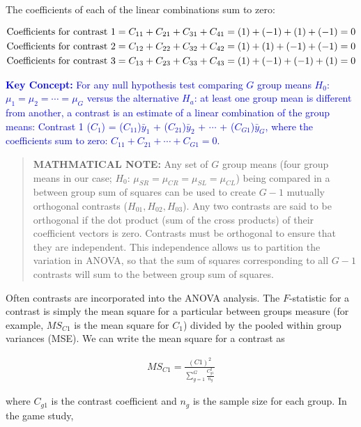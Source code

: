 \documentclass[
]{book}
\begin{document}
The coefficients of each of the linear combinations sum to zero:

\begin{align}
\text{Coefficients for contrast 1} &= C_{11} + C_{21} + C_{31} + C_{41} = (1) + (-1) + (1) + (-1) = 0 \notag \\
\text{Coefficients for contrast 2} &= C_{12} + C_{22} + C_{32} + C_{42} = (1) + (1) + (-1) + (-1) = 0 \notag \\
\text{Coefficients for contrast 3} &= C_{13} + C_{23} + C_{33} + C_{43} = (1) + (-1) + (-1) + (1) = 0
\notag
\end{align}

\textbf{\textcolor{blue}{Key Concept:}}
\textcolor{blue}{For any null hypothesis test comparing $G$ group means $H_0$: $\mu_1 = \mu_2 = \cdots = \mu_G$ versus the alternative $H_a$: at least one group mean is different from another, a contrast is an estimate of a linear combination of the group means: Contrast 1 ($C_1$) = ($C_{11}$)$\bar{y}_1$ + ($C_{21}$)$\bar{y}_2$ + $\cdots$ + ($C_{G1}$)$\bar{y}_G$, where the coefficients sum to zero: $C_{11} + C_{21} + \cdots + C_{G1} = 0$.}

\begin{quote}
\textbf{MATHMATICAL NOTE:}
Any set of \(G\) group means (four group means in our case; \(H_0\): \(\mu_{SR} = \mu_{CR} = \mu_{SL} = \mu_{CL}\)) being compared in a between group sum of squares can be used to create \(G-1\) mutually orthogonal contrasts (\(H_{01}, H_{02}, H_{03}\)). Any two contrasts are said to be orthogonal if the dot product (sum of the cross products) of their coefficient vectors is zero. Contrasts must be orthogonal to ensure that they are independent. This independence allows us to partition the variation in ANOVA, so that the sum of squares corresponding to all \(G-1\) contrasts will sum to the between group sum of squares.
\end{quote}

Often contrasts are incorporated into the ANOVA analysis. The \(F\)-statistic for a contrast is simply the mean square for a particular between groups measure (for example, \(MS_{C1}\) is the mean square for \(C_1\)) divided by the pooled within group variances (MSE). We can write the mean square for a contrast as

\begin{align}\label{4.15}
MS_{C1} = \frac{(C1)^2}{\sum_{g=1}^{G} \frac{C_{g1}^2}{n_g}}
\tag{4.15}
\end{align}

where \(C_{g1}\) is the contrast coefficient and \(n_g\) is the sample size for each group. In the game study,
\end{document}
